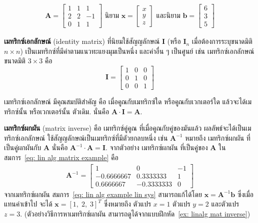 \begin{eqnarray}
\bm{A} = 
\begin{bmatrix}
1 & 1 & 1 \\
2 & 2 & -1 \\
0 & 1 & 1
\end{bmatrix}
\mbox{ นิยาม }
%
\bm{x} = 
\begin{bmatrix}
x \\
y \\
z
\end{bmatrix}
\mbox{ และนิยาม }
\bm{b} =
\begin{bmatrix}
6 \\
3 \\
5
\end{bmatrix}
\label{eq: lin alg matrix example}
\end{eqnarray}

\textbf{เมทริกซ์เอกลักษณ์} (identity matrix) ที่นิยมใช้สัญญลักษณ์ $\bm{I}$ 
(หรือ $\bm{I}_n$ เมื่อต้องการระบุขนาดมิติ $n \times n$)
เป็นเมทริกซ์ที่มีค่าตามแนวทะแยงมุมเป็นหนึ่ง และค่าอื่น ๆ เป็นศูนย์ เช่น
เมทริกซ์เอกลักษณ์ ขนาดมิติ $3 \times 3$ คือ
\[
\bm{I} = 
\begin{bmatrix}
1 & 0 & 0 \\
0 & 1 & 0 \\
0 & 0 & 1
\end{bmatrix}
\]

เมทริกซ์เอกลักษณ์ มีคุณสมบัติสำคัญ 
คือ เมื่อคูณกับเมทริกซ์ใด หรือคูณกับเวกเตอร์ใด 
แล้วจะได้เมทริกซ์นั้น หรือเวกเตอร์นั้น ตัวเดิม.
นั่นคือ $\bm{A} \cdot \bm{I} = \bm{A}$.

\textbf{เมทริกซ์ผกผัน} (matrix inverse) คือ เมทริกซ์คู่คูณ ที่เมื่อคูณกับคู่ของมันแล้ว ผลลัพธ์จะได้เป็นเมทริกซ์เอกลักษณ์
ใช้สัญญลักษณ์เป็นเมทริกซ์ที่มีตัวยกลบหนึ่ง
เช่น $\bm{A}^{-1}$ หมายถึง
เมทริกซ์ผกผัน ที่เป็นคู่ผกผันกับ $\bm{A}$
นั่นคือ $\bm{A}^{-1} \cdot \bm{A} = \bm{I}$.
จากตัวอย่าง 
เมทริกซ์ผกผัน ที่เป็นคู่ของ $\bm{A}$
ในสมการ~\ref{eq: lin alg matrix example} คือ
\begin{eqnarray}
\bm{A}^{-1} = 
\begin{bmatrix}
1 & 0 & -1 \\
-0.6666667 & 0.3333333  &  1 \\
0.6666667 & -0.3333333 & 0
\end{bmatrix}
\label{eq: lin alg example inv}
\end{eqnarray}
จากเมทริกซ์ผกผัน
สมการ~\ref{eq: lin alg example lin sys} สามารถแก้ได้โดย $\bm{x} = \bm{A}^{-1} \bm{b}$
ซึ่งเมื่อแทนค่าเข้าไป จะได้
$\bm{x} = [1, \; 2, \; 3]^T$
ซึ่งหมายถึง 
ตัวแปร $x = 1$
ตัวแปร $y = 2$
และตัวแปร $z = 3$.
(ตัวอย่างวิธีการหาเมทริกซ์ผกผัน สามารถดูได้จากแบบฝึกหัด~\ref{ex: linalg mat inverse})

